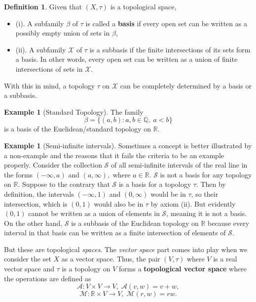 \documentclass[psamsfonts]{amsart}
\theoremstyle{definition}
\newtheorem{exmp}[thm]{Example}
\newtheorem{defn}[thm]{Definition}
\theoremstyle{remark}
\numberwithin{equation}{section}
\begin{document}
\begin{defn} 
Given that $(X, \tau)$ is a topological space, 
\begin{itemize}
    \item (i). A subfamily $\beta$ of $\tau$ is called a \textbf{basis} if every open set can be written as a possibly empty union of sets in $\beta$, 
    \item (ii). A subfamily $\mathcal{X}$ of $\tau$ is a subbasis if the finite intersections of its sets form a basis. In other words, every open set can be written as a union of finite intersections of sets in $\mathcal{X}$. 
\end{itemize}
With this in mind, a topology $\tau$ on $\mathcal{X}$ can be completely determined by a basis or a subbasis. 
\end{defn}

\begin{exmp} [Standard Topology]
The family 
$$\beta = \{(a,b) : a, b \in \mathbb{Q}, \; a < b \} $$
is a basis of the Euclidean/standard topology on $\mathbb{R}.$
\end{exmp}

\begin{exmp}[Semi-infinite intervals]
Sometimes a concept is better illustrated by a non-example and the reasons that it fails the criteria to be an example properly. Consider the collection $\mathcal{S}$ of all semi-infinite intervals of the real line in the forms $(-\infty, a)$ and $(a, \infty),$ where $a \in \mathbb{R}$. $\mathcal{S}$ is not a basis for any topology on $\mathbb{R}$. Suppose to the contrary that $\mathcal{S}$ is a basis for a topology $\tau$. Then by definition, the intervals $(- \infty, 1)$ and $(0, \infty)$ would be in $\tau$, so their intersection, which is $(0,1)$ would also be in $\tau$ by axiom (ii). But evidently $(0,1)$ cannot be written as a union of elements in $\mathcal{S}$, meaning it is not a basis. On the other hand, $\mathcal{S}$ is a subbasis of the Euclidean topology on $\mathbb{R}$ because every interval in that basis can be written as a finite intersection of elements of $\mathcal{S}$. 
\end{exmp}

But these are topological \textit{spaces}. The \textit{vector space} part comes into play when we consider the set $X$ as a vector space. Thus, the pair $(V, \tau)$ where $V$ is a real vector space and $\tau$ is a topology on $V$ forms a \textbf{topological vector space} where the operations are defined as 
$$\mathcal{A}: V \times V \rightarrow V, \; \mathcal{A} (v, w) = v+w,$$
$$\mathcal{M}: \mathbb{R} \times V \rightarrow V, \; \mathcal{M} (r, w) = rw.$$
\end{document}
